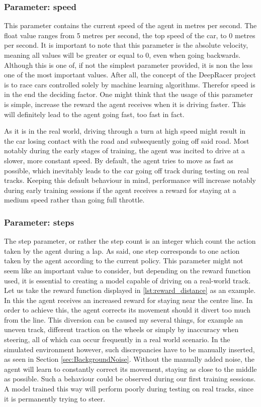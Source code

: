 \subsubsection{Parameter: speed}
This parameter contains the current speed of the agent in metres per second. The float value ranges from 5 metres per second, the top speed of the car, to 0 metres per second. It is important to note that this parameter is the absolute velocity, meaning all values will be greater or equal to 0, even when going backwards. Although this is one of, if not the simplest parameter provided, it is non the less one of the most important values. After all, the concept of the DeepRacer project is to race cars controlled solely by machine learning algorithms. Therefor speed is in the end the deciding factor. One might think that the usage of this parameter is simple, increase the reward the agent receives when it is driving faster. This will definitely lead to the agent going fast, too fast in fact. 

As it is in the real world, driving through a turn at high speed might result in the car losing contact with the road and subsequently going off said road. Most notably during the early stages of training, the agent was incited to drive at a slower, more constant speed. By default, the agent tries to move as fast as possible, which inevitably leads to the car going off track during testing on real tracks. Keeping this default behaviour in mind, performance will increase notably during early training sessions if the agent receives a reward for staying at a medium speed rather than going full throttle.

%
%

\subsubsection{Parameter: steps}
The step parameter, or rather the step count is an integer which count the action taken by the agent during a lap. As said, one step corresponds to one action taken by the agent according to the current policy. This parameter might not seem like an important value to consider, but depending on the reward function used, it is essential to creating a model capable of driving on a real-world track.
Let us take the reward function displayed in \ref{lst:reward_distance} as an example. In this the agent receives an increased reward for staying near the centre line. In order to achieve this, the agent corrects its movement should it divert too much from the line. This diversion can be caused my several things, for example an uneven track, different traction on the wheels or simply by inaccuracy when steering, all of which can occur frequently in a real world scenario. In the simulated environment however, such discrepancies have to be manually inserted, as seen in Section \ref{sec:BackgroundNoise}. Without the manually added noise, the agent will learn to constantly correct its movement, staying as close to the middle as possible. Such a behaviour could be observed during our first training sessions. A model trained this way will perform poorly during testing on real tracks, since it is permanently trying to steer.

